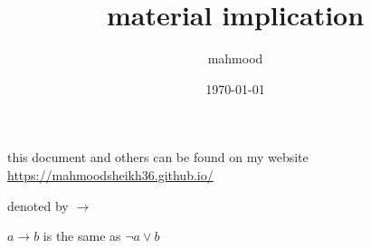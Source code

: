 \documentclass[a4paper,12pt]{article}
\author{mahmood}
\date{\today}
\title{material implication}
\begin{document}
\maketitle
\begin{note}
this document and others can be found on my website\\
\url{https://mahmoodsheikh36.github.io/}
\end{note}
denoted by \(\rightarrow\)\\
\begin{lemma}
\(a \rightarrow b\) is the same as \(\lnot a \lor b\)\\
\end{lemma}
\end{document}
